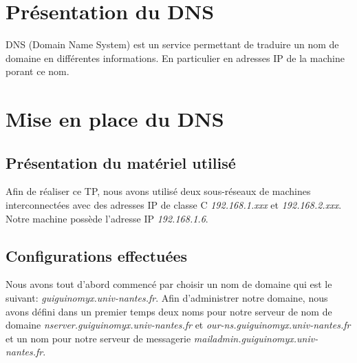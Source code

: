\documentclass[a4paper,10pt]{article}
\begin{document}
\section{Présentation du DNS}
DNS (Domain Name System) est un service permettant de traduire un nom de domaine en différentes informations. En particulier en adresses IP de la machine porant ce nom.

\section{Mise en place du DNS}
\subsection{Présentation du matériel utilisé}
Afin de réaliser ce TP, nous avons utilisé deux sous-réseaux de machines interconnectées avec des adresses IP de classe C \textit{192.168.1.xxx} et \textit{192.168.2.xxx}. Notre machine possède l'adresse IP \textit{192.168.1.6}.

\subsection{Configurations effectuées}
Nous avons tout d'abord commencé par choisir un nom de domaine qui est le suivant: \textit{guiguinomyx.univ-nantes.fr}. Afin d'administrer notre domaine, nous avons défini dans un premier temps deux noms pour notre serveur de nom de domaine \textit{nserver.guiguinomyx.univ-nantes.fr} et \textit{our-ns.guiguinomyx.univ-nantes.fr} et un nom pour notre serveur de messagerie \textit{mailadmin.guiguinomyx.univ-nantes.fr}.
\end{document}
